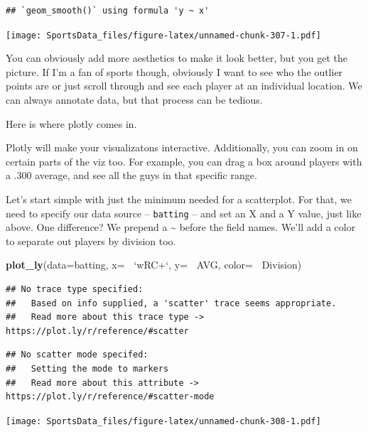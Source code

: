\documentclass[
]{book}
\newenvironment{Shaded}{\begin{snugshade}}{\end{snugshade}}
\newcommand{\DataTypeTok}[1]{\textcolor[rgb]{0.13,0.29,0.53}{#1}}
\newcommand{\KeywordTok}[1]{\textcolor[rgb]{0.13,0.29,0.53}{\textbf{#1}}}
\newcommand{\NormalTok}[1]{#1}
\newcommand{\OperatorTok}[1]{\textcolor[rgb]{0.81,0.36,0.00}{\textbf{#1}}}
\newcommand{\StringTok}[1]{\textcolor[rgb]{0.31,0.60,0.02}{#1}}
\begin{document}
\begin{verbatim}
## `geom_smooth()` using formula 'y ~ x'
\end{verbatim}

\texttt{[image: SportsData\_files/figure-latex/unnamed-chunk-307-1.pdf]}

You can obviously add more aesthetics to make it look better, but you get the picture. If I'm a fan of sports though, obviously I want to see who the outlier points are or just scroll through and see each player at an individual location. We can always annotate data, but that process can be tedious.

Here is where plotly comes in.

Plotly will make your visualizatons interactive. Additionally, you can zoom in on certain parts of the viz too. For example, you can drag a box around players with a .300 average, and see all the guys in that specific range.

Let's start simple with just the minimum needed for a scatterplot. For that, we need to specify our data source -- \texttt{batting} -- and set an X and a Y value, just like above. One difference? We prepend a \textasciitilde{} before the field names. We'll add a color to separate out players by division too.

\begin{Shaded}
\begin{Highlighting}[]
\KeywordTok{plot_ly}\NormalTok{(}\DataTypeTok{data=}\NormalTok{batting, }\DataTypeTok{x=} \OperatorTok{~}\StringTok{`}\DataTypeTok{wRC+}\StringTok{`}\NormalTok{, }\DataTypeTok{y=} \OperatorTok{~}\NormalTok{AVG, }\DataTypeTok{color=} \OperatorTok{~}\NormalTok{Division)}
\end{Highlighting}
\end{Shaded}

\begin{verbatim}
## No trace type specified:
##   Based on info supplied, a 'scatter' trace seems appropriate.
##   Read more about this trace type -> https://plot.ly/r/reference/#scatter
\end{verbatim}

\begin{verbatim}
## No scatter mode specifed:
##   Setting the mode to markers
##   Read more about this attribute -> https://plot.ly/r/reference/#scatter-mode
\end{verbatim}

\texttt{[image: SportsData\_files/figure-latex/unnamed-chunk-308-1.pdf]}
\end{document}
